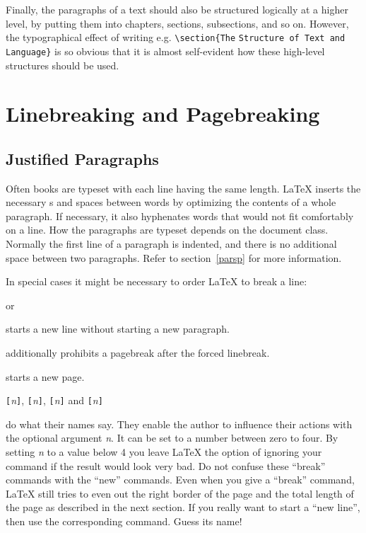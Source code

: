 Finally, the paragraphs of a text should also be structured logically
at a higher level, by putting them into chapters, sections,
subsections, and so on.  However, the typographical effect of writing
e.g.{} \verb|\section{The| \texttt{Structure of Text and Language}\verb|}| is
so obvious that it is almost self-evident how these high-level
structures should be used.

\section{Linebreaking and Pagebreaking}
 
\subsection{Justified Paragraphs}

Often books are typeset with each line having the same length.
\LaTeX{} inserts the necessary s and spaces between words
by optimizing the contents of a whole paragraph. If necessary, it
also hyphenates words that would not fit comfortably on a line.
How the paragraphs are typeset depends on the document class.
Normally the first line of a paragraph is indented, and there is no
additional space between two paragraphs. Refer to section~\ref{parsp}
for more information.

In special cases it might be necessary to order \LaTeX{} to break a
line: 
\begin{lscommand}
\ci{\bs} or  
\end{lscommand}
\noindent starts a new line without starting a new paragraph. 

\begin{lscommand}
\ci{\bs*}
\end{lscommand}
\noindent additionally prohibits a pagebreak after the forced
linebreak. 

\begin{lscommand}
\end{lscommand}
\noindent starts a new page. 

\begin{lscommand}
\verb|[|\emph{n}\verb|]|,
\verb|[|\emph{n}\verb|]|, 
\verb|[|\emph{n}\verb|]| and
\verb|[|\emph{n}\verb|]|
\end{lscommand}
\noindent do what their names say. They enable the author to influence their
actions with the optional argument \emph{n}. It can be set to a number
between zero to four. By setting \emph{n} to a value below 4 you leave
\LaTeX{} the option of ignoring your command if the result would look very
bad. Do not confuse these ``break'' commands with the ``new'' commands. Even
when you give a ``break'' command, \LaTeX{} still tries to even out the
right border of the page and the total length of the page as described in
the next section. If you really want to start a ``new line'', then use the
corresponding command. Guess its name!

